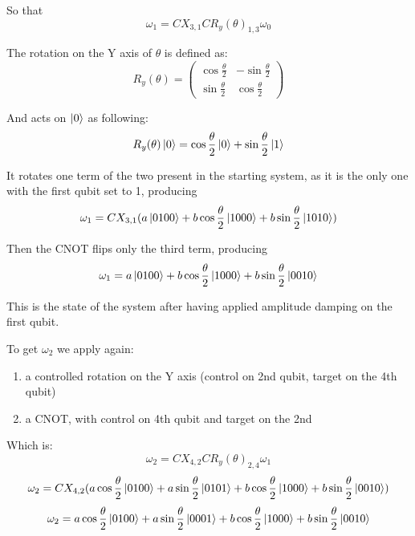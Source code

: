 \documentclass{masterthesis}
\begin{document}
So that
\begin{equation}
    \omega_1 = CX_{3,1} CR_{y}(\theta)_{1,3} \omega_0
\end{equation}

The rotation on the Y axis of $\theta$ is defined as:
\begin{equation}
    R_y(\theta) = \begin{pmatrix} \cos\frac{\theta}{2} & -\sin\frac{\theta}{2} \\ \sin\frac{\theta}{2} & \cos\frac{\theta}{2} \end{pmatrix}
\end{equation}

And acts on $\ket{0}$ as following:
\begin{equation}
    R_y(\theta)\ket{0} = \cos\frac{\theta}{2}\ket{0} + \sin\frac{\theta}{2}\ket{1}
\end{equation}

It rotates one term of the two present in the starting system, as it is the only one with the first qubit set to 1, producing
\begin{equation}
    \omega_1 = CX_{3,1} (a\ket{0100} + b\cos\frac{\theta}{2}\ket{1000} + b\sin\frac{\theta}{2}\ket{1010})
\end{equation}

Then the CNOT flips only the third term, producing
\begin{equation}
    \omega_1 = a\ket{0100} + b\cos\frac{\theta}{2}\ket{1000} + b\sin\frac{\theta}{2}\ket{0010}
\end{equation}

This is the state of the system after having applied amplitude damping on the first qubit.

To get $\omega_2$ we apply again:
\begin{enumerate}
    \item a controlled rotation on the Y axis (control on 2nd qubit, target on the 4th qubit) 
    \item a CNOT, with control on 4th qubit and target on the 2nd
\end{enumerate}

Which is:
\begin{equation}
    \omega_2 = CX_{4,2} CR_{y}(\theta)_{2,4} \omega_1
\end{equation}
\begin{equation}
    \omega_2 = CX_{4,2} (a\cos\frac{\theta}{2}\ket{0100} + a\sin\frac{\theta}{2}\ket{0101} + b\cos\frac{\theta}{2}\ket{1000} + b\sin\frac{\theta}{2}\ket{0010})
\end{equation}
\begin{equation}
    \omega_2 = a\cos\frac{\theta}{2}\ket{0100} + a\sin\frac{\theta}{2}\ket{0001} + b\cos\frac{\theta}{2}\ket{1000} + b\sin\frac{\theta}{2}\ket{0010}
\end{equation}
\end{document}
